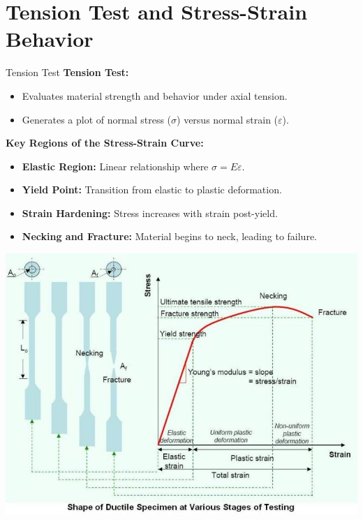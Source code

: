 \documentclass{beamer}
\begin{document}
\section{Tension Test and Stress-Strain Behavior}
\begin{frame}{Tension Test}
    \textbf{Tension Test:}
    \begin{itemize}
        \item Evaluates material strength and behavior under axial tension.
        \item Generates a plot of normal stress ($\sigma$) versus normal strain ($\varepsilon$).
    \end{itemize}
    \vspace{0.5cm}
    \textbf{Key Regions of the Stress-Strain Curve:}
    \begin{minipage}[t]{0.45\textwidth}
        \begin{itemize}
            \item \textbf{Elastic Region:} Linear relationship where $\sigma = E\varepsilon$.
            \item \textbf{Yield Point:} Transition from elastic to plastic deformation.
            \item \textbf{Strain Hardening:} Stress increases with strain post-yield.
            \item \textbf{Necking and Fracture:} Material begins to neck, leading to failure.
        \end{itemize}
    \end{minipage}
    \hfill
    \begin{minipage}[t]{0.5\textwidth}
        \vspace{0pt}
        \includegraphics[width=\textwidth]{Tension_Test.jpg}
    \end{minipage}
\end{frame}
\end{document}
